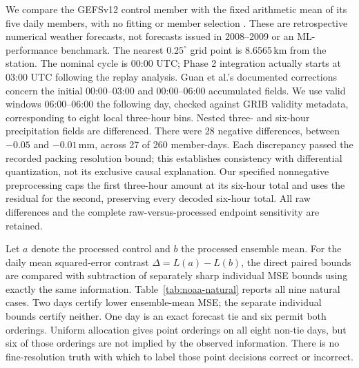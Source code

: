 \documentclass[12pt]{article}
\begin{document}
We compare the GEFSv12 control member with the fixed arithmetic mean of its
five daily members, with no fitting or member selection
\cite{guan2022gefs,noaa_gefs_archive}. These are retrospective numerical
weather forecasts, not forecasts issued in 2008--2009 or an ML-performance
benchmark. The nearest $0.25^{\circ}$ grid point is 8.6565\,km from the station.
The nominal cycle is 00:00 UTC; Phase 2 integration actually starts at 03:00
UTC following the replay analysis. Guan et al.'s documented corrections
concern the initial 00:00--03:00 and 00:00--06:00 accumulated fields. We use
valid windows 06:00--06:00 the following day, checked against GRIB validity
metadata, corresponding to eight local three-hour bins. Nested three- and
six-hour precipitation fields are differenced. There were 28 negative
differences, between $-0.05$ and $-0.01$\,mm,
across 27 of 260 member-days. Each discrepancy passed the recorded packing
resolution bound; this establishes consistency with differential quantization,
not its exclusive causal explanation. Our specified nonnegative preprocessing caps the first
three-hour amount at its six-hour total and uses the residual for the second,
preserving every decoded six-hour total. All raw differences and the complete
raw-versus-processed endpoint sensitivity are retained.

Let $a$ denote the processed control and $b$ the processed ensemble mean.
For the daily mean squared-error contrast $\Delta=L(a)-L(b)$, the direct
paired bounds are compared with subtraction of separately sharp individual
MSE bounds using exactly the same information. Table~\ref{tab:noaa-natural}
reports all nine natural cases. Two days certify lower ensemble-mean MSE;
the separate individual bounds certify neither. One day is an exact forecast
tie and six permit both orderings. Uniform allocation gives point orderings
on all eight non-tie days, but six of those orderings are not implied by the
observed information. There is no fine-resolution truth with which to label
those point decisions correct or incorrect.
\end{document}
